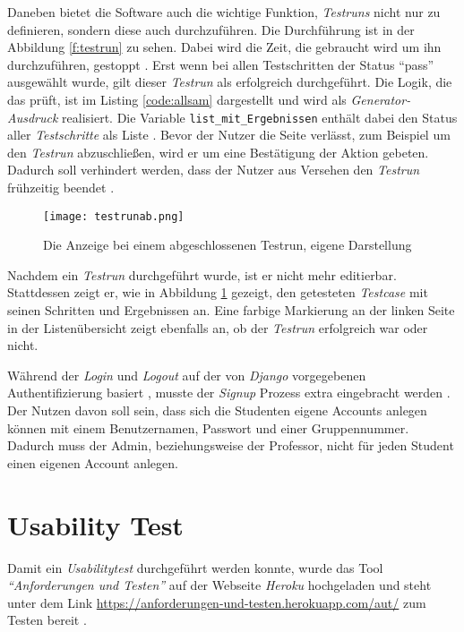 \documentclass[11pt,a4paper]{report}
\begin{document}
Daneben bietet die Software auch die wichtige Funktion, \textit{Testruns} nicht nur zu definieren, sondern diese auch durchzuführen. Die Durchführung ist in der Abbildung \ref{f:testrun} zu sehen. Dabei wird die Zeit, die gebraucht wird um ihn durchzuführen, gestoppt \cite{sotimer}. Erst wenn bei allen Testschritten der Status "`pass"' ausgewählt wurde, gilt dieser \textit{Testrun} als erfolgreich durchgeführt. Die Logik, die das prüft, ist im Listing \ref{code:allsam} dargestellt und wird als \textit{Generator-Ausdruck} realisiert. Die Variable \verb|list_mit_Ergebnissen| enthält dabei den Status aller \textit{Testschritte} als Liste \cite{soallsame}. Bevor der Nutzer die Seite verlässt, zum Beispiel um den \textit{Testrun} abzuschließen, wird er um eine Bestätigung der Aktion gebeten. Dadurch soll verhindert werden, dass der Nutzer aus Versehen den \textit{Testrun} frühzeitig beendet \cite{confirm}.



\begin{figure}[htpb]
  \centering
  \texttt{[image: testrunab.png]}
  \caption{Die Anzeige bei einem abgeschlossenen Testrun, eigene Darstellung}
  \label{f:testrunab}
\end{figure}


Nachdem ein \textit{Testrun} durchgeführt wurde, ist er nicht mehr editierbar. Stattdessen zeigt er, wie in Abbildung \ref{f:testrunab} gezeigt, den getesteten \textit{Testcase} mit seinen Schritten und Ergebnissen an. Eine farbige Markierung an der linken Seite in der Listenübersicht zeigt ebenfalls an, ob der \textit{Testrun} erfolgreich war oder nicht.




Während der \textit{Login} und \textit{Logout} auf der von \textit{Django} vorgegebenen Authentifizierung basiert \cite{mozillatuto10}, musste der \textit{Signup} Prozess extra eingebracht werden \cite{signup}. Der Nutzen davon soll sein, dass sich die Studenten eigene Accounts anlegen können mit einem Benutzernamen, Passwort und einer Gruppennummer. Dadurch muss der Admin, beziehungsweise der Professor, nicht für jeden Student einen eigenen Account anlegen.

 
 



\chapter{Usability Test} \label{chap:use}
Damit ein \textit{Usabilitytest} durchgeführt werden konnte, wurde das Tool \textit{"`Anforderungen und Testen"'} auf der Webseite \textit{Heroku} hochgeladen und steht unter dem Link \url{https://anforderungen-und-testen.herokuapp.com/aut/} zum Testen bereit \cite{heroku}.
\end{document}
